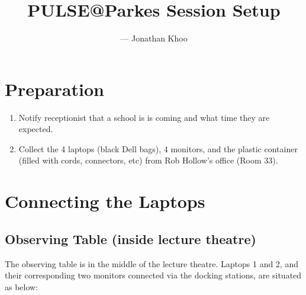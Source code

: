 \documentclass{article}
\title{PULSE@Parkes Session Setup}
\author{--- Jonathan Khoo}
\date{}
\begin{document}
\maketitle

\section{Preparation}
\begin{enumerate}
\item Notify receptionist that a school is is coming and what time they are expected.
\item Collect the 4 laptops (black Dell bags), 4 monitors, and the plastic container (filled with cords, connectors, etc) from Rob Hollow's office (Room 33).
\end{enumerate}


\section{Connecting the Laptops}
\subsection{Observing Table (inside lecture theatre)}
The observing table is in the middle of the lecture theatre. Laptops 1 and 2, and their corresponding two monitors connected via the docking stations, are situated as below:
\end{document}
